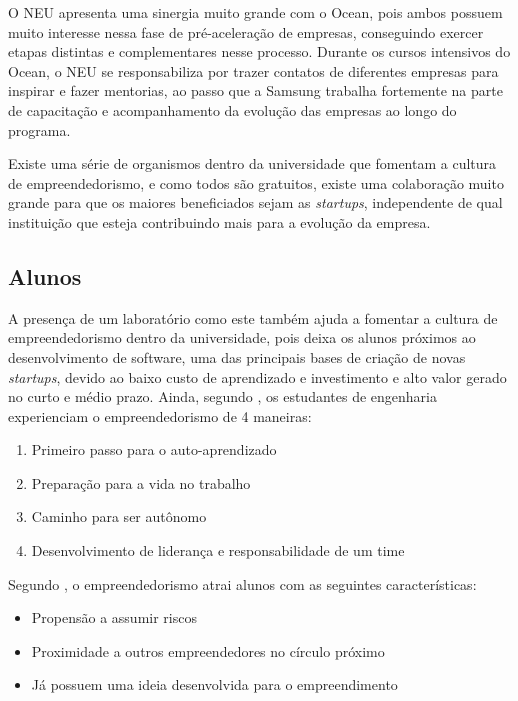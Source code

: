 O NEU apresenta uma sinergia muito grande com o Ocean, pois ambos possuem muito interesse nessa fase de pré-aceleração de empresas, conseguindo exercer etapas distintas e complementares nesse processo. Durante os cursos intensivos do Ocean, o NEU se responsabiliza por trazer contatos de diferentes empresas para inspirar e fazer mentorias, ao passo que a Samsung trabalha fortemente na parte de capacitação e acompanhamento da evolução das empresas ao longo do programa.

Existe uma série de organismos dentro da universidade que fomentam a cultura de empreendedorismo, e como todos são gratuitos, existe uma colaboração muito grande para que os maiores beneficiados sejam as \textit{startups}, independente de  qual instituição que esteja contribuindo mais para a evolução da empresa.

\subsection{Alunos}
\label{sec:con_alunos}

A presença de um laboratório como este também ajuda a fomentar a cultura de empreendedorismo dentro da universidade, pois deixa os alunos próximos ao desenvolvimento de software, uma das principais bases de criação de novas \textit{startups}, devido ao baixo custo de aprendizado e investimento e alto valor gerado no curto e médio prazo. Ainda, segundo , os estudantes de engenharia experienciam o empreendedorismo de 4 maneiras: 

\begin{enumerate}
\item Primeiro passo para o auto-aprendizado
\item Preparação para a vida no trabalho
\item Caminho para ser autônomo
\item Desenvolvimento de liderança e responsabilidade de um time
\end{enumerate}


Segundo , o empreendedorismo atrai alunos com as seguintes características:

\begin{itemize}
\item Propensão a assumir riscos
\item Proximidade a outros empreendedores no círculo próximo
\item Já possuem uma ideia desenvolvida para o empreendimento
\end{itemize}


